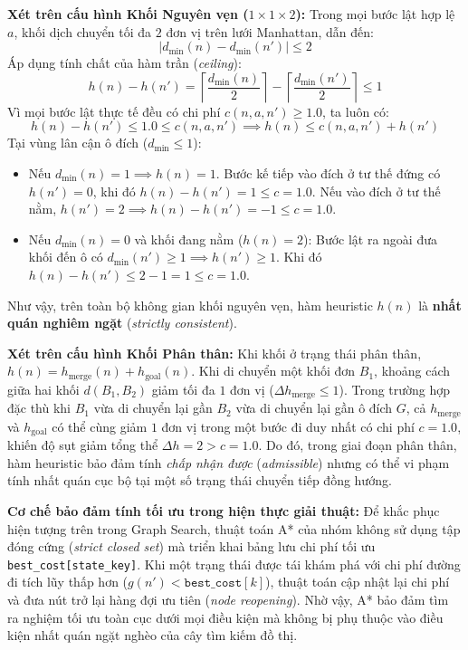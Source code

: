 \noindent
\textbf{Xét trên cấu hình Khối Nguyên vẹn ($1 \times 1 \times 2$):}
Trong mọi bước lật hợp lệ $a$, khối dịch chuyển tối đa $2$ đơn vị trên lưới Manhattan, dẫn đến:
\begin{equation}
    |d_{\min}(n) - d_{\min}(n')| \le 2
\end{equation}
Áp dụng tính chất của hàm trần (\textit{ceiling}):
\begin{equation}
    h(n) - h(n') = \left\lceil \frac{d_{\min}(n)}{2} \right\rceil - \left\lceil \frac{d_{\min}(n')}{2} \right\rceil \le 1
\end{equation}
Vì mọi bước lật thực tế đều có chi phí $c(n, a, n') \ge 1.0$, ta luôn có:
\begin{equation}
    h(n) - h(n') \le 1.0 \le c(n, a, n') \implies h(n) \le c(n, a, n') + h(n')
\end{equation}
Tại vùng lân cận ô đích ($d_{\min} \le 1$):
\begin{itemize}[--]
    \item Nếu $d_{\min}(n) = 1 \implies h(n) = 1$. Bước kế tiếp vào đích ở tư thế đứng có $h(n') = 0$, khi đó $h(n) - h(n') = 1 \le c = 1.0$. Nếu vào đích ở tư thế nằm, $h(n') = 2 \implies h(n) - h(n') = -1 \le c = 1.0$.
    \item Nếu $d_{\min}(n) = 0$ và khối đang nằm ($h(n) = 2$): Bước lật ra ngoài đưa khối đến ô có $d_{\min}(n') \ge 1 \implies h(n') \ge 1$. Khi đó $h(n) - h(n') \le 2 - 1 = 1 \le c = 1.0$.
\end{itemize}
Như vậy, trên toàn bộ không gian khối nguyên vẹn, hàm heuristic $h(n)$ là \textbf{nhất quán nghiêm ngặt} (\textit{strictly consistent}).

\vspace{0.2cm}
\noindent
\textbf{Xét trên cấu hình Khối Phân thân:}
Khi khối ở trạng thái phân thân, $h(n) = h_{\text{merge}}(n) + h_{\text{goal}}(n)$.
Khi di chuyển một khối đơn $B_1$, khoảng cách giữa hai khối $d(B_1, B_2)$ giảm tối đa $1$ đơn vị
($\Delta h_{\text{merge}} \le 1$). Trong trường hợp đặc thù khi $B_1$ vừa di chuyển lại gần $B_2$
vừa di chuyển lại gần ô đích $G$, cả $h_{\text{merge}}$ và $h_{\text{goal}}$ có thể cùng giảm $1$ đơn vị
trong một bước đi duy nhất có chi phí $c = 1.0$, khiến độ sụt giảm tổng thể $\Delta h = 2 > c = 1.0$.
Do đó, trong giai đoạn phân thân, hàm heuristic bảo đảm tính \textit{chấp nhận được} (\textit{admissible}) nhưng
có thể vi phạm tính nhất quán cục bộ tại một số trạng thái chuyển tiếp đồng hướng.

\noindent
\textbf{Cơ chế bảo đảm tính tối ưu trong hiện thực giải thuật:}
Để khắc phục hiện tượng trên trong Graph Search, thuật toán A* của nhóm không sử dụng tập đóng cứng (\textit{strict closed set})
mà triển khai bảng lưu chi phí tối ưu \texttt{best\_cost[state\_key]}. Khi một trạng thái được tái khám phá
với chi phí đường đi tích lũy thấp hơn ($g(n') < \texttt{best\_cost}[k]$), thuật toán cập nhật lại chi phí
và đưa nút trở lại hàng đợi ưu tiên (\textit{node reopening}). Nhờ vậy, A* bảo đảm tìm ra nghiệm tối ưu toàn cục
dưới mọi điều kiện mà không bị phụ thuộc vào điều kiện nhất quán ngặt nghèo của cây tìm kiếm đồ thị.

